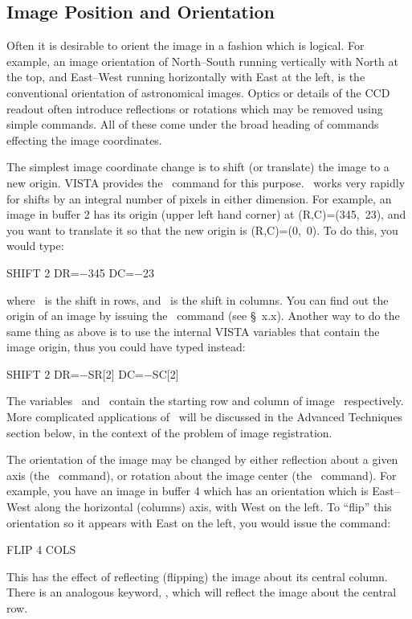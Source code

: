 
\subsection{Image Position and Orientation}
\label{sec:imposorient}
Often it is desirable to orient the image in a fashion which is logical. For
example, an image orientation of North--South running vertically with North at
the top, and East--West running horizontally with East at the left, is the
conventional orientation of astronomical images. Optics or details of the CCD
readout often introduce reflections or rotations which may be removed using
simple commands.  All of these come under the broad heading of commands 
effecting the image coordinates.

The simplest image coordinate change is to shift (or translate) the image to a
new origin.  VISTA provides the \ command for this purpose. 
\ works very rapidly for shifts by an integral number of pixels in
either dimension.  For example, an image in buffer 2 has its origin (upper
left hand corner) at (R,C)=(345,~23), and you want to translate it so that the
new origin is (R,C)=(0,~0).  To do this, you would type: 
\begin{command}
      \item SHIFT 2 DR=$-$345 DC=$-$23
\end{command}
where \ is the shift in rows, and \ is the shift in
columns.  You can find out the origin of an image by issuing the
\ command (see \S~x.x).  Another way to do the same thing as
above is to use the internal VISTA variables that contain the image origin,
thus you could have typed instead: 
\begin{command}
      \item SHIFT 2 DR=$-$SR[2] DC=$-$SC[2]
\end{command}
The variables \ and \ contain the starting row and
column of image \ respectively.  More complicated applications of
\ will be discussed in the Advanced Techniques section below, in
the context of the problem of image registration. 

The orientation of the image may be changed by either reflection about a given
axis (the \ command), or rotation about the image center (the
\ command).  For example, you have an image in buffer 4 which
has an orientation which is East--West along the horizontal (columns) axis,
with West on the left.  To ``flip'' this orientation so it appears with
East on the left, you would issue the command:
\begin{command}
      \item FLIP 4 COLS
\end{command}
This has the effect of reflecting (flipping) the image about its central
column.  There is an analogous keyword, , which will reflect
the image about the central row.

